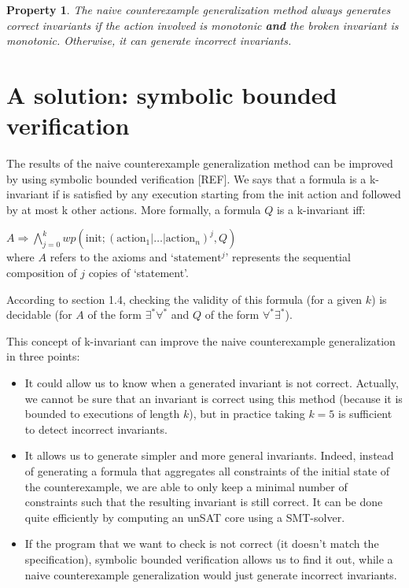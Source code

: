 \documentclass[11pt,a4paper,oldfontcommands,openany]{memoir}
\newtheorem*{property}{Property}
\begin{document}
    \begin{property}
        The naive counterexample generalization method always generates correct invariants if the action involved is monotonic
        \textbf{and} the broken invariant is monotonic.
        Otherwise, it can generate incorrect invariants.
    \end{property}

    \section{A solution: symbolic bounded verification}

    The results of the naive counterexample generalization method can be improved by using symbolic bounded verification [REF].
    We says that a formula is a k-invariant if is satisfied by any execution starting from the init action and followed by at most k
    other actions. More formally, a formula \(Q\) is a k-invariant iff:

    \( A \Rightarrow \bigwedge\limits_{j=0}^k wp(\text{init}; (\text{action}_1|\ldots|\text{action}_n)^j, Q) \)\\
    where \(A\) refers to the axioms and `\(\text{statement}^j\)' represents the sequential composition of \(j\) copies of `statement'.

    According to section 1.4, checking the validity of this formula (for a given \(k\)) is decidable (for \(A\) of the form \(\exists^*\forall^*\) and \(Q\) of the form \(\forall^*\exists^*\)).

    This concept of k-invariant can improve the naive counterexample generalization in three points:
    \begin{itemize}
        \item It could allow us to know when a generated invariant is not correct.
        Actually, we cannot be sure that an invariant is correct using this method (because it is bounded to executions of length \(k\)),
        but in practice taking \(k=5\) is sufficient to detect incorrect invariants.
        \item It allows us to generate simpler and more general invariants. Indeed, instead of generating a formula that
        aggregates all constraints of the initial state of the counterexample, we are able to only keep a minimal number of constraints
        such that the resulting invariant is still correct. It can be done quite efficiently by computing an unSAT core using a SMT-solver.
        \item If the program that we want to check is not correct (it doesn't match the specification), symbolic bounded verification
        allows us to find it out, while a naive counterexample generalization would just generate incorrect invariants.
    \end{itemize}
\end{document}

